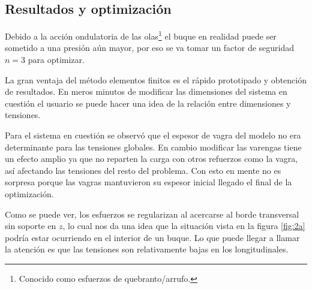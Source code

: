 \documentclass[onecolumn,10pt,titlepage]{article}
\begin{document}
\subsection{Resultados y optimización}
Debido a la acción ondulatoria de las olas\footnote{Conocido como esfuerzos de quebranto/arrufo.} el buque en realidad puede ser sometido a una presión aún mayor, por eso se va tomar un factor de seguridad $n=3$ para optimizar.

La gran ventaja del método elementos finitos es el rápido prototipado y obtención de resultados. En meros minutos de modificar las dimensiones del sistema en cuestión el usuario se puede hacer una idea de la relación entre dimensiones y tensiones.

Para el sistema en cuestión se observó que el espesor de vagra del modelo no era determinante para las tensiones globales. En cambio modificar las varengas tiene un efecto amplio ya que no reparten la carga con otros refuerzos como la vagra, así afectando las tensiones del resto del problema. Con esto en mente no es sorpresa porque las vagras mantuvieron su espesor inicial llegado el final de la optimización.

Como se puede ver, los esfuerzos se regularizan al acercarse al borde transversal sin soporte en $z$, lo cual nos da una idea que la situación vista en la figura \ref{fig:2a} podría estar ocurriendo en el interior de un buque. Lo que puede llegar a llamar la atención es que las tensiones son relativamente bajas en los longitudinales.
\end{document}
